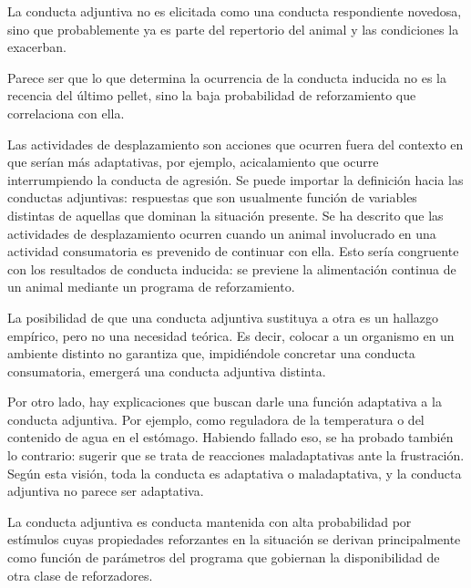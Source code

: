 \documentclass[a4paper,12pt]{article}
\begin{document}
La conducta adjuntiva no es elicitada como una conducta respondiente novedosa, sino que probablemente ya es parte del repertorio del animal y las condiciones la exacerban.

Parece ser que lo que determina la ocurrencia de la conducta inducida no es la recencia del último pellet, sino la baja probabilidad de reforzamiento que correlaciona con ella.

Las actividades de desplazamiento son acciones que ocurren fuera del contexto en que serían más adaptativas, por ejemplo, acicalamiento que ocurre interrumpiendo la conducta de agresión. Se puede importar la definición hacia las conductas adjuntivas: respuestas que son usualmente función de variables distintas de aquellas que dominan la situación presente. Se ha descrito que las actividades de desplazamiento ocurren cuando un animal involucrado en una actividad consumatoria es prevenido de continuar con ella. Esto sería congruente con los resultados de conducta inducida: se previene la alimentación continua de un animal mediante un programa de reforzamiento.

La posibilidad de que una conducta adjuntiva sustituya a otra es un hallazgo empírico, pero no una necesidad teórica. Es decir, colocar a un organismo en un ambiente distinto no garantiza que, impidiéndole concretar una conducta consumatoria, emergerá una conducta adjuntiva distinta.

Por otro lado, hay explicaciones que buscan darle una función adaptativa a la conducta adjuntiva. Por ejemplo, como reguladora de la temperatura o del contenido de agua en el estómago. Habiendo fallado eso, se ha probado también lo contrario: sugerir que se trata de reacciones maladaptativas ante la frustración. Según esta visión, toda la conducta es adaptativa o maladaptativa, y la conducta adjuntiva no parece ser adaptativa.

La conducta adjuntiva es conducta mantenida con alta probabilidad por estímulos cuyas propiedades reforzantes en la situación se derivan principalmente como función de parámetros del programa que gobiernan la disponibilidad de otra clase de reforzadores.
\end{document}
